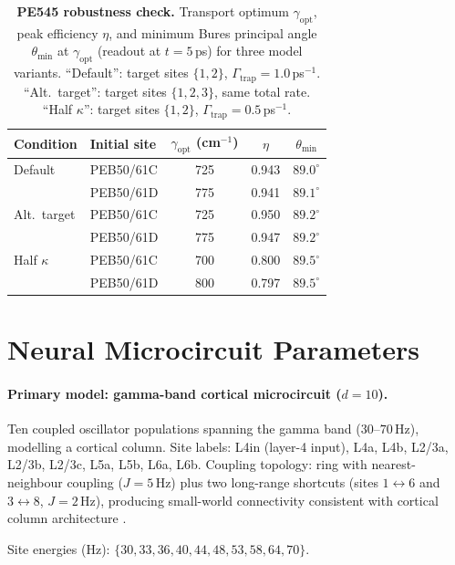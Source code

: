 \documentclass[12pt,a4paper]{article}
\theoremstyle{definition}
\theoremstyle{remark}
\begin{document}
\begin{table}[H]
\centering
\caption{\textbf{PE545 robustness check.} Transport optimum $\gamma_{\mathrm{opt}}$, peak efficiency $\eta$, and minimum Bures principal angle $\theta_{\min}$ at $\gamma_{\mathrm{opt}}$ (readout at $t = 5$\,ps) for three model variants. ``Default'': target sites $\{1,2\}$, $\Gamma_{\mathrm{trap}} = 1.0$\,ps$^{-1}$. ``Alt.\ target'': target sites $\{1,2,3\}$, same total rate. ``Half $\kappa$'': target sites $\{1,2\}$, $\Gamma_{\mathrm{trap}} = 0.5$\,ps$^{-1}$.}
\label{tab:pe545-robustness}
\smallskip
\begin{tabular}{llccc}
\hline
Condition & Initial site & $\gamma_{\mathrm{opt}}$ (cm$^{-1}$) & $\eta$ & $\theta_{\min}$ \\
\hline
Default       & PEB50/61C & 725 & 0.943 & $89.0^\circ$ \\
              & PEB50/61D & 775 & 0.941 & $89.1^\circ$ \\[3pt]
Alt.\ target  & PEB50/61C & 725 & 0.950 & $89.2^\circ$ \\
              & PEB50/61D & 775 & 0.947 & $89.2^\circ$ \\[3pt]
Half $\kappa$ & PEB50/61C & 700 & 0.800 & $89.5^\circ$ \\
              & PEB50/61D & 800 & 0.797 & $89.5^\circ$ \\
\hline
\end{tabular}
\end{table}

\section{Neural Microcircuit Parameters}
\label{app:neural}

\paragraph{Primary model: gamma-band cortical microcircuit ($d = 10$).}

Ten coupled oscillator populations spanning the gamma band ($30$--$70$\,Hz), modelling a cortical column. Site labels: L4in (layer-4 input), L4a, L4b, L2/3a, L2/3b, L2/3c, L5a, L5b, L6a, L6b. Coupling topology: ring with nearest-neighbour coupling ($J = 5$\,Hz) plus two long-range shortcuts (sites $1 \leftrightarrow 6$ and $3 \leftrightarrow 8$, $J = 2$\,Hz), producing small-world connectivity consistent with cortical column architecture \cite{buzsaki2012mechanisms}.

Site energies (Hz): $\{30, 33, 36, 40, 44, 48, 53, 58, 64, 70\}$.
\end{document}
